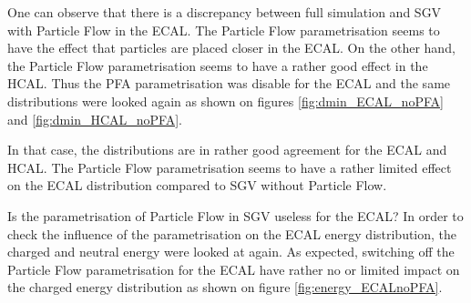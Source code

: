 One can observe that there is a discrepancy between full simulation and SGV with Particle Flow in the ECAL. The Particle Flow parametrisation seems to have the effect that particles are placed closer in the ECAL. On the other hand, the Particle Flow parametrisation seems to have a rather good effect in the HCAL. Thus the PFA parametrisation was disable for the ECAL and the same distributions were looked again as shown on figures \ref{fig:dmin_ECAL_noPFA} and \ref{fig:dmin_HCAL_noPFA}.



In that case, the distributions are in rather good agreement for the ECAL and HCAL. The Particle Flow parametrisation seems to have a rather limited effect on the ECAL distribution compared to SGV without Particle Flow.

Is the parametrisation of Particle Flow in SGV useless for the ECAL? In order to check the influence of the parametrisation on the ECAL energy distribution, the charged and neutral energy were looked at again. As expected, switching off the Particle Flow parametrisation for the ECAL have rather no or limited impact on the charged energy distribution as shown on figure \ref{fig:energy_ECALnoPFA}.

